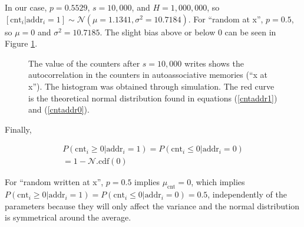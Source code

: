In our case, $p=0.5529$, $s=10,000$, and $H=1,000,000$, so $[\text{cnt}_i | \text{addr}_i=1] \sim \mathcal{N}(\mu=1.1341, \sigma^2 = 10.7184)$. For ``random at x'', $p=0.5$, so $\mu = 0$ and $\sigma^2 = 10.7185$. The slight bias above or below 0 can be seen in Figure \ref{fig:sdm-corr-counters}.

\begin{figure}[h!]
  \centering


  \caption{The value of the counters after $s=10,000$ writes shows the autocorrelation in the counters in autoassociative memories (``x at x''). The histogram was obtained through simulation. The red curve is the theoretical normal distribution found in equations (\ref{cntaddr1}) and (\ref{cntaddr0}).}
  \label{fig:sdm-corr-counters}
\end{figure}


Finally,

\begin{align}
P(\text{cnt}_i \ge 0 | \text{addr}_i = 1) = P(\text{cnt}_i \le 0 | \text{addr}_i = 0) \\
 = 1 - \mathcal{N}.\text{cdf}(0)
\end{align}

For ``random written at x'', $p=0.5$ implies $\mu_\text{cnt} = 0$, which implies $P(\text{cnt}_i \ge 0 | \text{addr}_i = 1) = P(\text{cnt}_i \le 0 | \text{addr}_i = 0) = 0.5$, independently of the parameters because they will only affect the variance and the normal distribution is symmetrical around the average.

